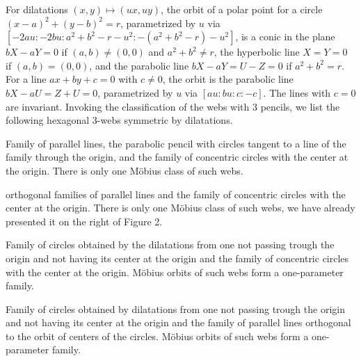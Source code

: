\documentclass[11pt,a4paper]{article}
\begin{document}
\noindent For  dilatations $(x,y)\mapsto (ux,uy)$, the orbit of a polar point for  a circle $(x-a)^2+(y-b)^2=r$,  parametrized  by $u$ via $[-2au:-2bu: a^2+b^2-r-u^2: -(a^2+b^2-r)-u^2]$, is a conic in the plane $bX-aY=0$ if $(a,b)\ne (0,0)$ and $a^2+b^2\ne r$, the hyperbolic line $X=Y=0$ if $(a,b)= (0,0)$, and the parabolic line $bX-aY=U-Z=0$ if   $a^2+b^2=r$. For a  line $ax+by+c=0$ with $c\ne 0$, the orbit is the parabolic line $bX-aU=Z+U=0$, parametrized by $u$ via $[au:bu:c:-c]$. The lines with $c=0$ are invariant.
Invoking the classification of the webs with 3 pencils,  we list the following hexagonal 3-webs symmetric by dilatations.

\bigskip
{}


\bigskip
{}

\noindent Family of parallel lines, the parabolic pencil with circles tangent to a  line of the family through the origin, and the family of concentric circles with the center at the origin. There is only one M\"obius class of such webs.  

\bigskip
{}

 orthogonal  families  of parallel lines and the family of concentric circles with the center at the origin. There is only one M\"obius class of such webs, we have already presented it on the right of Figure 2.   

\bigskip
{}

\noindent Family of circles obtained by the dilatations from one not passing trough the origin and not having its center at the origin and the family of concentric circles with the center at the origin. M\"obius orbits of such webs form a one-parameter family.   

\bigskip
{}

\noindent Family of circles obtained by dilatations from one not passing trough the origin and not having its center at the origin and the family of parallel lines orthogonal to the orbit of centers of the circles. M\"obius orbits of such webs form a one-parameter family.   
\end{document}
